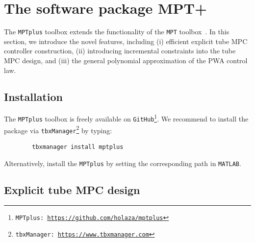 \documentclass[letterpaper, 10 pt, conference]{ieeeconf}
\begin{document}
	
	\section{The software package MPT+}
	\label{sec:code}
	
	
	
	The \texttt{MPTplus} toolbox extends the functionality of the \texttt{MPT} toolbox~\cite{MPT3}. In this section, we introduce the novel features, including (i) efficient explicit tube MPC controller construction, (ii) introducing incremental constraints into the tube MPC design, and (iii) the general polynomial approximation of the PWA control law. 
	
	\subsection{Installation}
	\label{sec:installation}
	
	The \texttt{MPTplus} toolbox is freely available on \texttt{GitHub}\footnote{\texttt{MPTplus: \url{https://github.com/holaza/mptplus}}}. We recommend to install the package via \texttt{tbxManager}\footnote{\texttt{tbxManager: \url{https://www.tbxmanager.com}}} by typing:
	\begin{verbatim}
		tbxmanager install mptplus
	\end{verbatim} 
	Alternatively, install the \texttt{MPTplus} by setting the corresponding path in \texttt{MATLAB}. 
	
	
	\subsection{Explicit tube MPC design}
	\label{sec:mptplus_tube_mpc}
	
\end{document}
